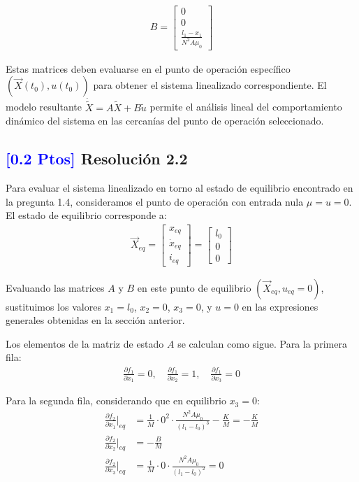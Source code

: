 \documentclass[
  11pt,
  letterpaper,
   addpoints,
   answers
  ]{exam}
\begin{document}
\begin{solution}
\begin{align}
B = \begin{bmatrix}
0 \\
0 \\
\displaystyle \frac{l_1 - x_1}{N^2 A \mu_0}
\end{bmatrix}
\end{align}

Estas matrices deben evaluarse en el punto de operación específico $(\vec{X}(t_0), u(t_0))$ para obtener el sistema linealizado correspondiente. El modelo resultante $\dot{\tilde{X}} = A \tilde{X} + B \tilde{u}$ permite el análisis lineal del comportamiento dinámico del sistema en las cercanías del punto de operación seleccionado.

\subsection*{\textcolor{blue}{[0.2 Ptos]} Resolución 2.2}

Para evaluar el sistema linealizado en torno al estado de equilibrio encontrado en la pregunta 1.4, consideramos el punto de operación con entrada nula $\mu = u = 0$. El estado de equilibrio corresponde a:
\begin{align}
\vec{X}_{eq} = \begin{bmatrix}
x_{eq} \\ \dot{x}_{eq} \\ i_{eq}
\end{bmatrix} = \begin{bmatrix}
l_0 \\ 0 \\ 0
\end{bmatrix}
\end{align}

Evaluando las matrices $A$ y $B$ en este punto de equilibrio $(\vec{X}_{eq}, u_{eq} = 0)$, sustituimos los valores $x_1 = l_0$, $x_2 = 0$, $x_3 = 0$, y $u = 0$ en las expresiones generales obtenidas en la sección anterior.

Los elementos de la matriz de estado $A$ se calculan como sigue. Para la primera fila:
\begin{align}
\frac{\partial f_1}{\partial x_1} = 0, \quad
\frac{\partial f_1}{\partial x_2} = 1, \quad
\frac{\partial f_1}{\partial x_3} = 0
\end{align}

Para la segunda fila, considerando que en equilibrio $x_3 = 0$:
\begin{align}
\frac{\partial f_2}{\partial x_1}\Big|_{eq} &= \frac{1}{M} \cdot 0^2 \cdot \frac{N^2 A \mu_0}{(l_1 - l_0)^3} - \frac{K}{M} = -\frac{K}{M}\\
\frac{\partial f_2}{\partial x_2}\Big|_{eq} &= -\frac{B}{M}\\
\frac{\partial f_2}{\partial x_3}\Big|_{eq} &= \frac{1}{M} \cdot 0 \cdot \frac{N^2 A \mu_0}{(l_1 - l_0)^2} = 0
\end{align}


\end{solution}
\end{document}
